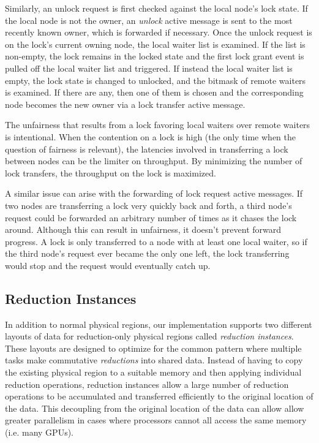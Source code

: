 Similarly, an unlock request is first checked against the local node's lock state.  If the local node is
not the owner, an {\em unlock} active message is sent to the most recently known owner, which is forwarded
if necessary.  Once the unlock request is on the lock's current owning node, the local waiter list is
examined.  If the list is non-empty, the lock remains in the locked state and the first lock grant
event is pulled off the local waiter list and triggered.  If instead the local waiter list is empty, the
lock state is changed to unlocked, and the bitmask of remote waiters is examined.  If there are any, then
one of them is chosen and the corresponding node becomes the new owner via a lock transfer active message.

The unfairness that results from a lock favoring local waiters over remote waiters is intentional.  When the
contention on a lock is high (the only time when the question of fairness is relevant), the latencies
involved in transferring a lock between nodes can be the limiter on throughput.  By minimizing the number
of lock transfers, the throughput on the lock is maximized.

A similar issue can arise with the forwarding of lock request active messages.  If two nodes are
transferring a lock very quickly back and forth, a third node's request could be forwarded an arbitrary
number of times as it chases the lock around.  Although this can result in unfairness, it doesn't 
prevent forward progress.  A lock is only transferred to a node with at least one local waiter, so if 
the third node's request ever became the only one left, the lock transferring would stop and the request
would eventually catch up.

\subsection{Reduction Instances}
\label{subsec:reducimpl}

In addition to normal physical regions, our implementation supports two different layouts of data for
reduction-only physical regions called {\em reduction instances}.   
These layouts are designed to optimize for the common pattern where 
multiple tasks make commutative {\em reductions} into shared data.  Instead of having to copy the existing 
physical region to a suitable memory and then applying individual reduction operations, reduction instances 
allow a large number of reduction operations to be accumulated and transferred efficiently to the original 
location of the data. This decoupling from the original location of the data can allow allow greater parallelism
in cases where processors cannot all access the same memory (i.e. many GPUs).

